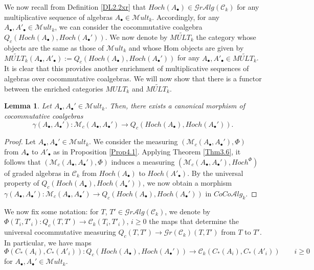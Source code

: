 \documentclass[10pt, colorlinks]{article}
\numberwithin{equation}{section} \DeclareMathSizes{2}{10}{12}{13}
\newtheorem{lem}[thm]{Lemma}
\begin{document}
\smallskip 
We now recall from Definition \ref{DL2.2xr} that $Hoch(A_\bullet)\in \mathscr Gr\mathcal Alg(\mathcal C_k)$ for any multiplicative sequence of algebras $A_\bullet\in 
\mathscr Mult_k$. Accordingly, for any $A_\bullet, A'_\bullet\in 
\mathscr Mult_k$, we can consider  the cocommutative coalgebra $Q_c(Hoch(A_\bullet), Hoch(A_\bullet'))$. We now denote by  $\widetilde{MULT_k}$ the category whose objects are the same as those of $\mathscr Mult_k$ and whose Hom objects are given by 
 $\widetilde{MULT_k}(A_\bullet,A'_\bullet):=Q_c(Hoch(A_\bullet), Hoch(A_\bullet'))$ for any $A_\bullet,A'_\bullet\in \widetilde{MULT_k}$.  It is clear that   this provides another enrichment of multiplicative sequences of algebras over cocommutative coalgebras.  We will now show that there is a functor between the enriched categories $MULT_k$ and $\widetilde{MULT_k}$.


 \begin{lem}\label{lem4.4}
        Let $A_\bullet,A_\bullet'\in \mathscr Mult_k$. Then, there exists a canonical morphism of cocommutative coalgebras 
        \begin{equation}
            \gamma(A_\bullet,A_\bullet'):\mathcal M_c(A_\bullet,A_\bullet')\longrightarrow Q_c(Hoch(A_\bullet), Hoch(A_\bullet')).
        \end{equation}
    \end{lem}


    
    \begin{proof}
        Let  $A_\bullet,A_\bullet'\in \mathscr Mult_k$. We consider the measuring $(\mathcal M_c(A_\bullet, A_\bullet'),\Phi)$ from $A_\bullet$ to $A'_\bullet$ as in Proposition \ref{Prop4.1}. Applying  Theorem \ref{Thm3.6}, it follows that $(\mathcal M_c(A_\bullet,A_\bullet'),\Phi)$ induces a measuring $(\mathcal M_c(A_\bullet,A_\bullet'),Hoch^{\Phi})$ of graded algebras in $\mathcal C_k$  from $Hoch(A_\bullet)$ to $Hoch(A'_\bullet)$. By the universal property of $Q_c(Hoch(A_\bullet), Hoch(A_\bullet'))$, we now obtain a  morphism $\gamma(A_\bullet,A_\bullet'):\mathcal M_c(A_\bullet,A_\bullet')\longrightarrow Q_c(Hoch(A_\bullet), Hoch(A_\bullet'))$ in $CoCo\mathcal Alg_k$.
    \end{proof}

We now fix some notation: for $T$, $T'\in  \mathscr Gr\mathcal Alg(\mathcal C_k)$, we denote by $\Phi(T_i,T'_i):Q_c(T,T')\longrightarrow \mathcal C_k(T_i,T'_i)$, $i\geq 0$ the maps that determine the universal cocommutative measuring $Q_c(T,T')
\longrightarrow   \mathscr Gr(\mathcal C_k)(T,T')$ from $T$ to $T'$. In particular, we have maps 
\begin{equation}\label{4.10p}
\Phi(C_*(A_i),C_*(A'_i)):Q_c(Hoch(A_\bullet), Hoch(A_\bullet'))\longrightarrow   \mathcal C_k(C_*(A_i),C_*(A'_i))\qquad i\geq 0
\end{equation}
 for $A_\bullet,A_\bullet'\in \mathscr Mult_k$.
  
\end{document}

